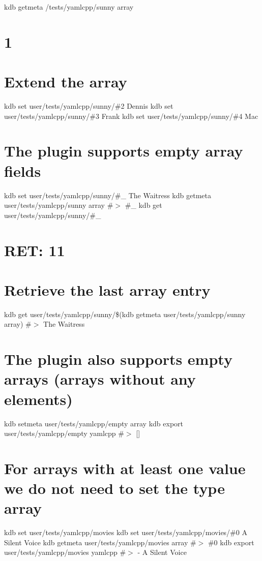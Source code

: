 kdb getmeta /tests/yamlcpp/sunny array \section*{1}

\section*{Extend the array}

kdb set user/tests/yamlcpp/sunny/\#2 Dennis kdb set user/tests/yamlcpp/sunny/\#3 Frank kdb set user/tests/yamlcpp/sunny/\#4 Mac

\section*{The plugin supports empty array fields}

kdb set user/tests/yamlcpp/sunny/\#\+\_ \textquotesingle{}The Waitress\textquotesingle{} kdb getmeta user/tests/yamlcpp/sunny array \#$>$ \#\+\_ kdb get user/tests/yamlcpp/sunny/\#\+\_ \section*{R\+ET\+: 11}

\section*{Retrieve the last array entry}

kdb get user/tests/yamlcpp/sunny/\$(kdb getmeta user/tests/yamlcpp/sunny array) \#$>$ The Waitress

\section*{The plugin also supports empty arrays (arrays without any elements)}

kdb setmeta user/tests/yamlcpp/empty array \textquotesingle{}\textquotesingle{} kdb export user/tests/yamlcpp/empty yamlcpp \#$>$ \mbox{[}\mbox{]}

\section*{For arrays with at least one value we do not need to set the type {\ttfamily array}}

kdb set user/tests/yamlcpp/movies kdb set user/tests/yamlcpp/movies/\#0 \textquotesingle{}A Silent Voice\textquotesingle{} kdb getmeta user/tests/yamlcpp/movies array \#$>$ \#0 kdb export user/tests/yamlcpp/movies yamlcpp \#$>$ -\/ A Silent Voice


